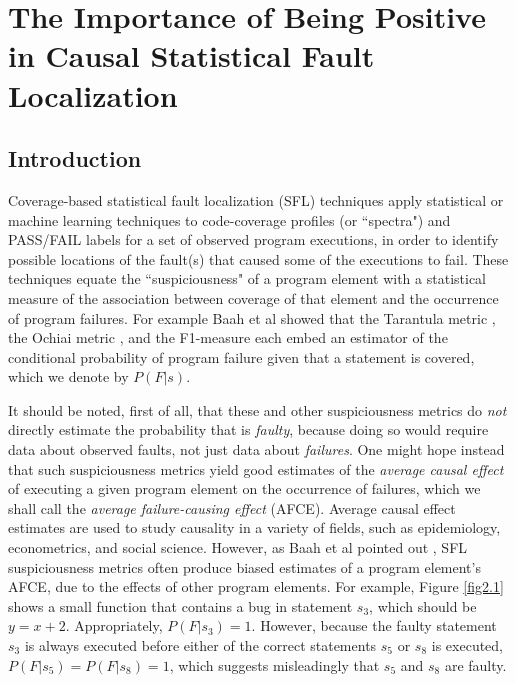 \chapter{The Importance of Being Positive 
in Causal Statistical Fault Localization}\label{chap:importance}

\section{Introduction}\label{sec1}
Coverage-based statistical fault localization (SFL) techniques apply statistical or machine learning techniques to code-coverage profiles (or ``spectra") and PASS/FAIL labels for a set of observed program executions, in order to identify possible locations of the fault(s) that caused some of the executions to fail.  These techniques equate the ``suspiciousness" of a program element with a statistical measure of the association between coverage of that element and the occurrence of program failures.  For example Baah et al showed \cite{baah2010causal} that the Tarantula metric \cite{jones2002visualization}, the Ochiai metric \cite{abreu2007accuracy}, and the F1-measure \cite{baah2010causal} each embed an estimator of the conditional probability of program failure given that a statement  is covered, which we denote by $P(F|s)$.  

It should be noted, first of all, that these and other suspiciousness metrics do {\it not} directly estimate the probability that is {\it faulty}, because doing so would require data about observed faults, not just data about {\it failures}.  One might hope instead that such suspiciousness metrics yield good estimates of the {\it average causal effect} \cite{pearl2000models} of executing a given program element on the occurrence of failures, which we shall call the {\it average failure-causing effect} (AFCE).  Average causal effect estimates are used to study causality in a variety of fields, such as epidemiology, econometrics, and social science.  However, as Baah et al pointed out \cite{baah2010causal}, SFL suspiciousness metrics often produce biased estimates of a program element’s AFCE, due to the effects of other program elements.  For example, Figure \ref{fig2.1} shows a small function that contains a bug in statement $s_3$, which should be $y=x+2$.  Appropriately, $P(F|s_3)=1$.  However, because the faulty statement $s_3$ is always executed before either of the correct statements $s_5$ or $s_8$ is executed, $P(F|s_5)=P(F|s_8)=1$, which suggests misleadingly that $s_5$ and $s_8$ are faulty.

